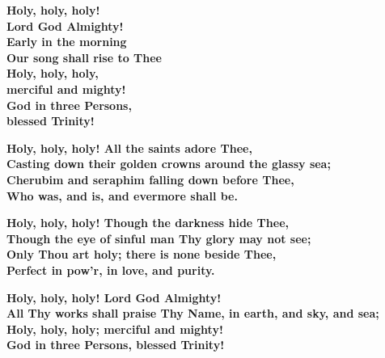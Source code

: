 \documentclass[landscape,10pt]{foils}
\newcommand{\oursection}[1]{\foilhead[-1.0cm]{#1}}
\newcommand{\V}[1]{\textbf{#1 \\}\newpage}
\begin{document}
\center\huge\color{white}
\V{ Holy, holy, holy! \\
    Lord God Almighty! \\
    Early in the morning \\
    Our song shall rise to Thee \\
Holy, holy, holy, \\
    merciful and mighty! \\
    God in three Persons, \\
    blessed Trinity!}

\V{ Holy, holy, holy! All the saints adore Thee, \\
    Casting down their golden crowns around the glassy sea; \\
    Cherubim and seraphim falling down before Thee, \\
    Who was, and is, and evermore shall be.}

\V{ Holy, holy, holy! Though the darkness hide Thee, \\
    Though the eye of sinful man Thy glory may not see; \\
    Only Thou art holy; there is none beside Thee, \\
    Perfect in pow’r, in love, and purity.}

\V{ Holy, holy, holy! Lord God Almighty! \\
    All Thy works shall praise Thy Name, in earth, and sky, and sea; \\
    Holy, holy, holy; merciful and mighty! \\
    God in three Persons, blessed Trinity!}
\end{document}
